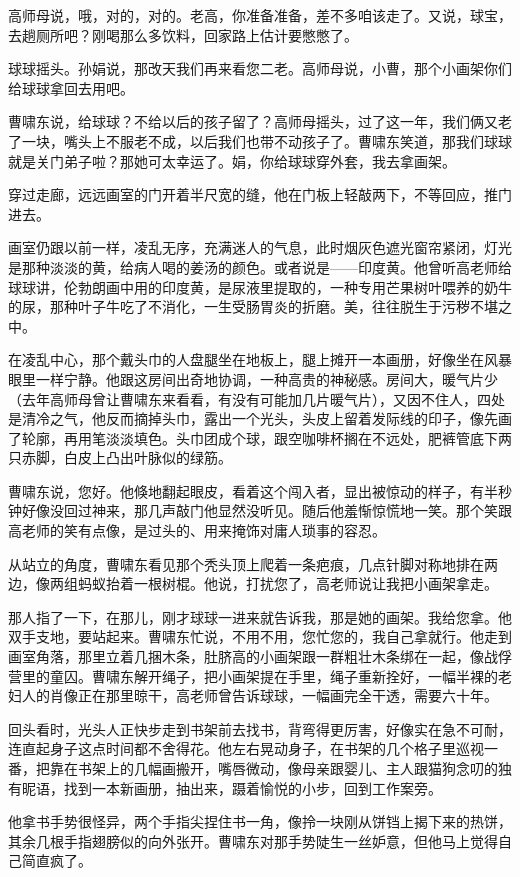 \documentclass[lang=cn,newtx,12pt,scheme=chinese]{elegantbook}
\begin{document}
高师母说，哦，对的，对的。老高，你准备准备，差不多咱该走了。又说，球宝，去趟厕所吧？刚喝那么多饮料，回家路上估计要憋憋了。

球球摇头。孙娟说，那改天我们再来看您二老。高师母说，小曹，那个小画架你们给球球拿回去用吧。

曹啸东说，给球球？不给以后的孩子留了？高师母摇头，过了这一年，我们俩又老了一块，嘴头上不服老不成，以后我们也带不动孩子了。曹啸东笑道，那我们球球就是关门弟子啦？那她可太幸运了。娟，你给球球穿外套，我去拿画架。

穿过走廊，远远画室的门开着半尺宽的缝，他在门板上轻敲两下，不等回应，推门进去。

画室仍跟以前一样，凌乱无序，充满迷人的气息，此时烟灰色遮光窗帘紧闭，灯光是那种淡淡的黄，给病人喝的姜汤的颜色。或者说是——印度黄。他曾听高老师给球球讲，伦勃朗画中用的印度黄，是尿液里提取的，一种专用芒果树叶喂养的奶牛的尿，那种叶子牛吃了不消化，一生受肠胃炎的折磨。美，往往脱生于污秽不堪之中。

在凌乱中心，那个戴头巾的人盘腿坐在地板上，腿上摊开一本画册，好像坐在风暴眼里一样宁静。他跟这房间出奇地协调，一种高贵的神秘感。房间大，暖气片少（去年高师母曾让曹啸东来看看，有没有可能加几片暖气片），又因不住人，四处是清冷之气，他反而摘掉头巾，露出一个光头，头皮上留着发际线的印子，像先画了轮廓，再用笔淡淡填色。头巾团成个球，跟空咖啡杯搁在不远处，肥裤管底下两只赤脚，白皮上凸出叶脉似的绿筋。

曹啸东说，您好。他倏地翻起眼皮，看着这个闯入者，显出被惊动的样子，有半秒钟好像没回过神来，那几声敲门他显然没听见。随后他羞惭惊慌地一笑。那个笑跟高老师的笑有点像，是过头的、用来掩饰对庸人琐事的容忍。

从站立的角度，曹啸东看见那个秃头顶上爬着一条疤痕，几点针脚对称地排在两边，像两组蚂蚁抬着一根树棍。他说，打扰您了，高老师说让我把小画架拿走。

那人指了一下，在那儿，刚才球球一进来就告诉我，那是她的画架。我给您拿。他双手支地，要站起来。曹啸东忙说，不用不用，您忙您的，我自己拿就行。他走到画室角落，那里立着几捆木条，肚脐高的小画架跟一群粗壮木条绑在一起，像战俘营里的童囚。曹啸东解开绳子，把小画架提在手里，绳子重新拴好，一幅半裸的老妇人的肖像正在那里晾干，高老师曾告诉球球，一幅画完全干透，需要六十年。

回头看时，光头人正快步走到书架前去找书，背弯得更厉害，好像实在急不可耐，连直起身子这点时间都不舍得花。他左右晃动身子，在书架的几个格子里巡视一番，把靠在书架上的几幅画搬开，嘴唇微动，像母亲跟婴儿、主人跟猫狗念叨的独有昵语，找到一本新画册，抽出来，蹑着愉悦的小步，回到工作案旁。

他拿书手势很怪异，两个手指尖捏住书一角，像拎一块刚从饼铛上揭下来的热饼，其余几根手指翅膀似的向外张开。曹啸东对那手势陡生一丝妒意，但他马上觉得自己简直疯了。
\end{document}
